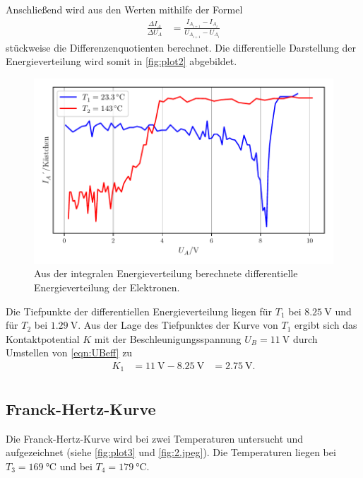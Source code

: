 Anschließend wird aus den Werten mithilfe der Formel
\begin{align*}
  \frac{\Delta I_A}{\Delta U_A} &= \frac{I_{A_{i+1}}-I_{A_i}}{U_{A_{i+1}}-U_{A_i}}\label{eqn:diffquo}
\end{align*}
stückweise die Differenzenquotienten berechnet.
Die differentielle Darstellung der Energieverteilung wird somit in \autoref{fig:plot2} abgebildet.

\begin{figure}[H]
  \centering
  \includegraphics[width=\textwidth]{build/plot2.pdf}
  \caption {Aus der integralen Energieverteilung berechnete differentielle Energieverteilung der Elektronen.}
  \label{fig:plot2}
\end{figure}
Die Tiefpunkte der differentiellen Energieverteilung liegen für $T_1$ bei $\qty{8.25}{\volt}$ und für $T_2$ bei $\qty{1.29}{\volt}$.
Aus der Lage des Tiefpunktes der Kurve von $T_1$ ergibt sich das Kontaktpotential $K$ mit der Beschleunigungsspannung $U_B= \qty{11}{\volt}$
durch Umstellen von \autoref{eqn:UBeff} zu
\begin{align*}
  K_1 &= \qty{11}{\volt}-\qty{8.25}{\volt} &= \qty{2.75}{\volt}.\\
\end{align*}

\subsection{Franck-Hertz-Kurve} %
\label{sub:Franck-Hertz-Kurve}
Die Franck-Hertz-Kurve wird bei zwei Temperaturen untersucht und aufgezeichnet (siehe \autoref{fig:plot3} und \autoref{fig:2.jpeg}). 
Die Temperaturen liegen bei $T_3= \qty{169}{\celsius}$ und bei $T_4= \qty{179}{\celsius}$.

